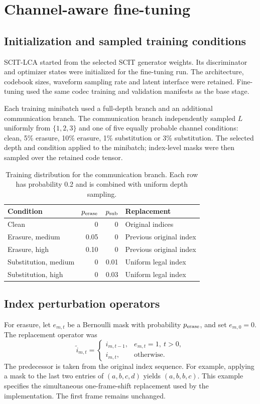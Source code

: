\section{Channel-aware fine-tuning}
\label{sec:sv2-lca}

\subsection{Initialization and sampled training conditions}
SCIT-LCA started from the selected SCIT generator weights. Its discriminator and optimizer states were initialized for the fine-tuning run. The architecture, codebook sizes, waveform sampling rate and latent interface were retained. Fine-tuning used the same codec training and validation manifests as the base stage.

Each training minibatch used a full-depth branch and an additional communication branch. The communication branch independently sampled $L$ uniformly from $\{1,2,3\}$ and one of five equally probable channel conditions: clean, 5\% erasure, 10\% erasure, 1\% substitution or 3\% substitution. The selected depth and condition applied to the minibatch; index-level masks were then sampled over the retained code tensor.

\begin{table}[t]
\centering
\caption{Training distribution for the communication branch. Each row has probability 0.2 and is combined with uniform depth sampling.}
\label{tab:sv2-lca-conditions}
\small
\begin{tabularx}{\columnwidth}{@{}lrrY@{}}
\toprule
Condition & $p_{\rm erase}$ & $p_{\rm sub}$ & Replacement\\
\midrule
Clean & 0 & 0 & Original indices\\
Erasure, medium & 0.05 & 0 & Previous original index\\
Erasure, high & 0.10 & 0 & Previous original index\\
Substitution, medium & 0 & 0.01 & Uniform legal index\\
Substitution, high & 0 & 0.03 & Uniform legal index\\
\bottomrule
\end{tabularx}
\end{table}

\subsection{Index perturbation operators}
For erasure, let $e_{m,t}$ be a Bernoulli mask with probability $p_{\rm erase}$, and set $e_{m,0}=0$. The replacement operator was
\begin{equation}
 \widetilde i_{m,t}=
 \begin{cases}
 i_{m,t-1}, & e_{m,t}=1,\ t>0,\\
 i_{m,t}, & \text{otherwise}.
 \end{cases}
 \label{eq:sv2-erasure}
\end{equation}
The predecessor is taken from the original index sequence. For example, applying a mask to the last two entries of $(a,b,c,d)$ yields $(a,b,b,c)$. This example specifies the simultaneous one-frame-shift replacement used by the implementation. The first frame remains unchanged.


